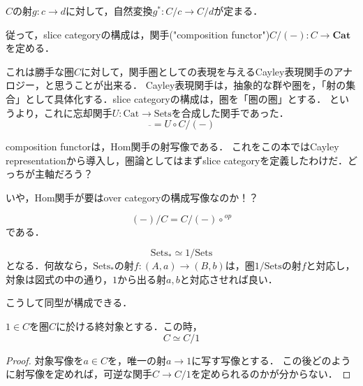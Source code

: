 \documentclass[uplatex, 12pt, dvipdfmx]{jsarticle}
\begin{document}
$C$の射$g:c\to d$に対して，自然変換$g^*:C/c\to C/d$が定まる．
\begin{center}\end{center}

従って，slice categoryの構成は，関手("composition functor")$C/(-):C\to \mathbf{Cat}$を定める．

これは勝手な圏$C$に対して，関手圏としての表現を与えるCayley表現関手のアナロジー，と思うことが出来る．
Cayley表現関手は，抽象的な群や圏を，「射の集合」として具体化する．slice categoryの構成は，圏を「圏の圏」とする．
というより，これに忘却関手$U:\mathrm{Cat}\to\mathrm{Sets}$を合成した関手であった．
\[ \overline{　} = U\circ C/(-) \]

\begin{remark*}
    composition functorは，Hom関手の射写像である．
    これをこの本ではCayley representationから導入し，圏論としてはまずslice categoryを定義したわけだ．どっちが主軸だろう？

    いや，Hom関手が要はover categoryの構成写像なのか！？
\end{remark*}

\begin{proposition*}
    \[ (-)/C = C/(-)\circ {}^{op} \]
    である．
\end{proposition*}

\begin{example}
    \[\mathrm{Sets}_*\simeq 1/\mathrm{Sets}\]
    となる．何故なら，$\mathrm{Sets}_*$の射$f:(A,a)\to (B,b)$は，圏$1/\mathrm{Sets}$の射$f$と対応し，対象は図式の中の通り，$1$から出る射$a,b$と対応させれば良い．
    \begin{center}
    \end{center}
    こうして同型が構成できる．
\end{example}

\begin{proposition*}
    $1\in C$を圏$C$に於ける終対象とする．この時，
    \[ C\simeq C/1 \]
\end{proposition*}
\begin{proof}
    対象写像を$a\in C$を，唯一の射$a\to 1$に写す写像とする．
    この後どのように射写像を定めれば，可逆な関手$C\to C/1$を定められるのかが分からない．
\end{proof}
\end{document}
